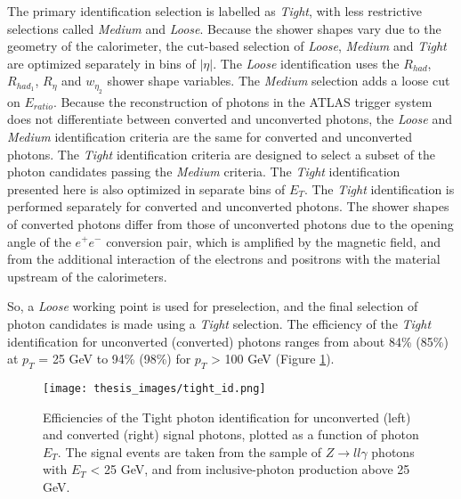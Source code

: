 \documentclass[a4paper, oneside, 11pt, openright]{book}
\begin{document}
				The primary identification selection is labelled as \textit{Tight}, with less restrictive selections called \textit{Medium} and \textit{Loose}. Because the shower shapes vary due to the geometry of the calorimeter, the cut-based selection of \textit{Loose}, \textit{Medium} and \textit{Tight} are optimized separately in bins of $|\eta|$. The \textit{Loose} identification uses the $R_{had}$, $R_{had_1}$, $R_{\eta}$ and $w_{\eta_2}$ shower shape variables. The \textit{Medium} selection adds a loose cut on $E_{ratio}$. Because the reconstruction of photons in the ATLAS trigger system does not differentiate between converted and unconverted photons, the \textit{Loose} and \textit{Medium} identification criteria are the same for converted and unconverted photons. The \textit{Tight} identification criteria are designed to select a subset of the photon candidates passing the \textit{Medium} criteria. The \textit{Tight} identification presented here is also optimized in separate bins of $E_T$. The \textit{Tight} identification is performed separately for converted and unconverted photons. The shower shapes of converted photons differ from those of unconverted photons due to the opening angle of the $e^+e^-$ conversion pair, which is amplified by the magnetic field, and from the additional interaction of the electrons and positrons with the material upstream of the calorimeters. 
				
				So, a \textit{Loose} working point is used for preselection, and the final selection of photon candidates is made using a \textit{Tight} selection. The efficiency of the \textit{Tight} identification for unconverted (converted) photons ranges from about 84\% (85\%) at $p_T$ = 25 GeV to 94\% (98\%) for $p_T$ > 100 GeV \cite{Aad_2019} (Figure \ref{fig:tight_id}).
				
				\vspace{-1.83cm}
				
				\begin{figure}
					\centering
					\texttt{[image: thesis\_images/tight\_id.png]} 
					\caption{Efficiencies of the Tight photon identification for unconverted (left) and converted (right) signal photons, plotted as a function of photon $E_T$. The signal events are taken from the sample of $Z\to ll\gamma$ photons with $E_T$ < 25 GeV,	and from inclusive-photon production above 25 GeV.}
					\label{fig:tight_id}
				\end{figure}
				
\end{document}
